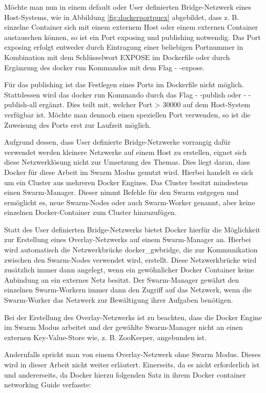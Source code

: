 Möchte man nun in einem default oder User definierten Bridge-Netzwerk eines Host-Systems, wie in Abbildung \ref{fig:dockerportpuex} abgebildet, dass z. B. einzelne Container sich mit einem externem Host oder einem externen Container austauschen können, so ist ein Port exposing und publishing notwendig.
Das Port exposing erfolgt entweder durch Eintragung einer beliebigen Portnummer in Kombination mit dem Schlüsselwort EXPOSE im Dockerfile oder durch Ergänzung des docker run Kommandos mit dem Flag - -expose.

Für das publishing ist das Festlegen eines Ports im Dockerfile nicht möglich.
Stattdessen wird das docker run Kommando durch das Flag - -publish oder - -publish-all ergänzt.
Dies teilt mit, welcher Port > 30000 auf dem Host-System verfügbar ist.
Möchte man dennoch einen speziellen Port verwenden, so ist die Zuweisung des Ports erst zur Laufzeit möglich.

Aufgrund dessen, dass User definierte Bridge-Netzwerke vorrangig dafür verwendet werden kleinere Netzwerke auf einem Host zu erstellen, eignet sich diese Netzwerklösung nicht zur Umsetzung des Themas.
Dies liegt daran, dass Docker für diese Arbeit im Swarm Modus genutzt wird.
Hierbei handelt es sich um ein Cluster aus mehreren Docker Engines.
Das Cluster besitzt mindestens einen Swarm-Manager.
Dieser nimmt Befehle für den Swarm entgegen und ermöglicht es, neue Swarm-Nodes oder auch Swarm-Worker genannt, aber keine einzelnen Docker-Container zum Cluster hinzuzufügen.

Statt des User definierten Bridge-Netzwerks bietet Docker hierfür die Möglichkeit zur Erstellung eines Overlay-Netzwerks auf einem Swarm-Manager an.
Hierbei wird automatisch die Netzwerkbrücke docker\_gwbridge, die zur Kommunikation zwischen den Swarm-Nodes verwendet wird, erstellt.
Diese Netzwerkbrücke wird zusätzlich immer dann angelegt, wenn ein gewöhnlicher Docker Container keine Anbindung an ein externes Netz besitzt.
Der Swarm-Manager gewährt den einzelnen Swarm-Workern immer dann den Zugriff auf das Netzwerk, wenn die Swarm-Worker das Netzwerk zur Bewältigung ihrer Aufgaben benötigen. 

Bei der Erstellung des Overlay-Netzwerks ist zu beachten, dass die Docker Engine im Swarm Modus arbeitet und der gewählte Swarm-Manager nicht an einen externen Key-Value-Store wie, z. B. ZooKeeper, angebunden ist.

Andernfalls spricht man von einem Overlay-Netzwerk ohne Swarm Modus.
Dieses wird in dieser Arbeit nicht weiter erläutert.
Einerseits, da es nicht erforderlich ist und andererseits, da Docker hierzu folgenden Satz in ihrem Docker container networking Guide verfasste:

